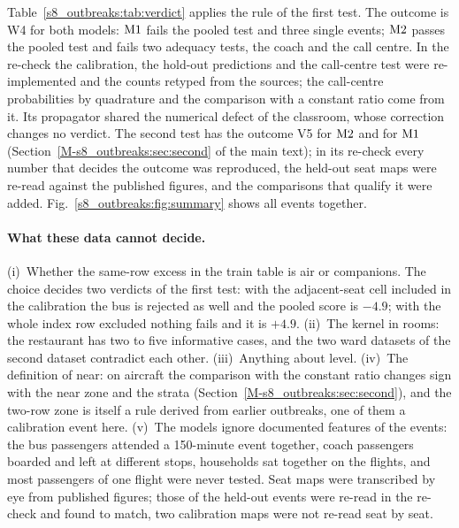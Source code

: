 Table~\ref{s8_outbreaks:tab:verdict} applies the rule of the first test. The outcome is W4 for both models:
$\mathrm{M1}$ fails the pooled test and three single events; $\mathrm{M2}$ passes the pooled test and fails two adequacy
tests, the coach and the call centre. In the re-check the calibration, the hold-out predictions and the
call-centre test were re-implemented and the counts retyped from the sources; the call-centre probabilities by
quadrature and the comparison with a constant ratio come from it. Its propagator shared the numerical defect of the
classroom, whose correction changes no verdict. The second test has the outcome V5 for $\mathrm{M2}$ and for $\mathrm{M1}$
(Section~\ref{M-s8_outbreaks:sec:second} of the main text); in its re-check every number that decides the outcome was
reproduced, the held-out seat maps were re-read against the published figures, and the comparisons that qualify it
were added. Fig.~\ref{s8_outbreaks:fig:summary} shows all events together.

\paragraph{What these data cannot decide.} (i)~Whether the same-row excess in the train table is air or
companions. The choice decides two verdicts of the first test: with the adjacent-seat cell included in the
calibration the bus is rejected as well and the pooled score is $-4.9$; with the whole index row excluded
nothing fails and it is $+4.9$.
(ii)~The kernel in rooms: the restaurant has two to five informative cases, and the two ward datasets of the
second dataset contradict each other. (iii)~Anything about level. (iv)~The definition of near: on aircraft the
comparison with the constant ratio changes sign with the near zone and the strata
(Section~\ref{M-s8_outbreaks:sec:second}), and the two-row zone is itself a rule derived from earlier outbreaks,
one of them a calibration event here. (v)~The models ignore documented features of the events: the bus
passengers attended a 150-minute event together, coach passengers boarded and left at different stops,
households sat together on the flights, and most passengers of one flight were never tested. Seat maps were
transcribed by eye from published figures; those of the held-out events were re-read in the re-check
and found to match, two calibration maps were not re-read seat by seat.
